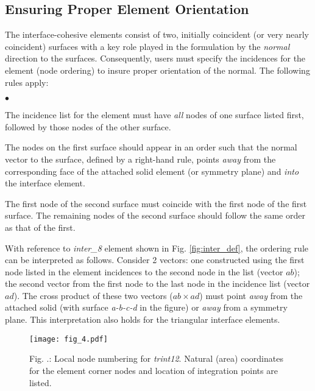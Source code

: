 \documentclass[11pt]{report}
\numberwithin{equation}{section}
\newcommand{\ti}{\emph}
\newcommand{\squishlist}{
 \begin{list}{$\bullet$}
  { \setlength{\itemsep}{0pt}
     \setlength{\parsep}{3pt}
     \setlength{\topsep}{3pt}
     \setlength{\partopsep}{0pt}
     \setlength{\leftmargin}{1.5em}
     \setlength{\labelwidth}{1em}
     \setlength{\labelsep}{0.5em} } }
\newcommand{\squishend}{
  \end{list}  }
\renewcommand{\thefigure}{\thesection.\arabic{figure}}
\begin{document}
%
\subsection{Ensuring Proper Element Orientation}
The interface-cohesive elements consist of two, initially coincident (or very
nearly coincident) surfaces 
with a key role played in the formulation by the \ti{normal} direction to the surfaces. 
Consequently, users must specify the incidences for the element 
(node ordering) to insure proper orientation of the normal. 
The following rules apply:
%
\squishlist
\item The incidence list for the element must have \ti{all} 
nodes of one surface listed first, followed by those nodes of the other surface.
\item The nodes on the first surface should appear in an order 
such that the normal vector to the surface, defined by a right-hand 
rule, points \ti{away} from the corresponding face of the attached 
solid element (or symmetry plane) and \ti{into} the interface element.
\item The first node of the second surface must coincide with 
the first node of the first surface. The remaining nodes of the second 
surface should follow the same order as that of the first.
\squishend

With reference to \ti{inter\_8} element
shown in Fig. \ref{fig:inter_def}, the ordering rule can be interpreted as follows. 
Consider 2 vectors: one constructed using the first node listed in 
the element incidences to the second 
node in the list (vector $ab$); the second vector 
from the first node to the last node in 
the incidence list (vector  $ad$). The cross product of these two 
vectors ($ab \times ad$) must point \ti{away} from the attached solid (with 
surface \ti{a-b-c-d} in the figure) or \ti{away} from a symmetry plane. 
This interpretation also holds 
for the triangular interface elements. 
%
\begin{figure}[htb]
\begin{center}
\texttt{[image: fig\_4.pdf]} 
\caption{{\small Fig. \thefigure: Local node numbering for \ti{trint12}. 
Natural (area) coordinates for the element corner nodes and 
location of integration points are listed.}\label{fig:tri12_def}}
%
\end{center}
\end{figure}
\end{document}
